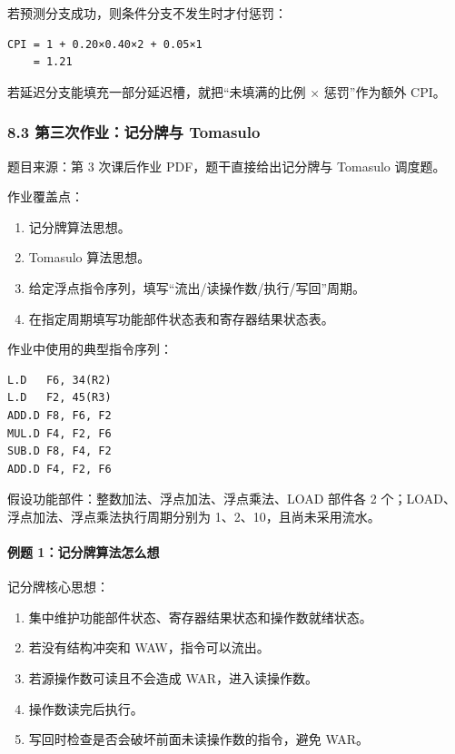 \documentclass[
]{ctexart}
\providecommand{\tightlist}{%
  \setlength{\itemsep}{0pt}\setlength{\parskip}{0pt}}
\begin{document}
若预测分支成功，则条件分支不发生时才付惩罚：

\begin{lstlisting}
CPI = 1 + 0.20×0.40×2 + 0.05×1
    = 1.21
\end{lstlisting}

若延迟分支能填充一部分延迟槽，就把``未填满的比例 × 惩罚''作为额外 CPI。

\subsubsection{8.3 第三次作业：记分牌与
Tomasulo}\label{ux7b2cux4e09ux6b21ux4f5cux4e1aux8bb0ux5206ux724cux4e0e-tomasulo}

题目来源：第 3 次课后作业 PDF，题干直接给出记分牌与 Tomasulo 调度题。

作业覆盖点：

\begin{enumerate}
\def\labelenumi{\arabic{enumi}.}
\tightlist
\item
  记分牌算法思想。
\item
  Tomasulo 算法思想。
\item
  给定浮点指令序列，填写``流出/读操作数/执行/写回''周期。
\item
  在指定周期填写功能部件状态表和寄存器结果状态表。
\end{enumerate}

作业中使用的典型指令序列：

\begin{lstlisting}
L.D   F6, 34(R2)
L.D   F2, 45(R3)
ADD.D F8, F6, F2
MUL.D F4, F2, F6
SUB.D F8, F4, F2
ADD.D F4, F2, F6
\end{lstlisting}

假设功能部件：整数加法、浮点加法、浮点乘法、LOAD 部件各 2
个；LOAD、浮点加法、浮点乘法执行周期分别为 1、2、10，且尚未采用流水。

\paragraph{例题
1：记分牌算法怎么想}\label{ux4f8bux9898-1ux8bb0ux5206ux724cux7b97ux6cd5ux600eux4e48ux60f3}

记分牌核心思想：

\begin{enumerate}
\def\labelenumi{\arabic{enumi}.}
\tightlist
\item
  集中维护功能部件状态、寄存器结果状态和操作数就绪状态。
\item
  若没有结构冲突和 WAW，指令可以流出。
\item
  若源操作数可读且不会造成 WAR，进入读操作数。
\item
  操作数读完后执行。
\item
  写回时检查是否会破坏前面未读操作数的指令，避免 WAR。
\end{enumerate}
\end{document}
